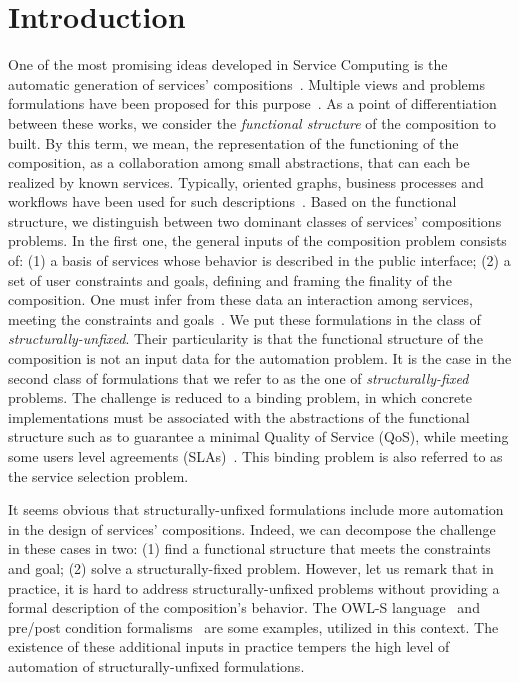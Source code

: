 \documentclass[a4paper]{article}
\begin{document}
\section{Introduction}


One of the most promising ideas developed in Service Computing is the automatic generation  
of services' compositions~\cite{Papazoglou03service-orientedcomputing,SOCValery,Bartalos}. 
Multiple views and problems formulations have been proposed for this purpose~\cite{Rao04asurvey}. 
As a point of differentiation between these works, we consider the {\it functional structure} 
of the composition to built. By this term, we mean, the representation of the functioning of the composition, as a 
collaboration among small abstractions, that can each be realized by known services. Typically, oriented graphs, 
 business processes and workflows have been used for such descriptions~\cite{Cardoso2004281,Weske2007,GoldmanNgoko}. 
Based on the functional structure, we distinguish between two dominant classes of services' compositions problems. 
In the first one, the general inputs of the composition problem consists of: (1) a basis of services whose behavior is described in the public interface; (2) a set of user constraints and goals, defining and framing the finality of the composition. 
One must infer from these data an interaction among services, meeting the constraints 
and goals~\cite{Bartalos,Sirin:2004:HPW:1741306.1741331,Jiang}. We put these formulations in the class of {\it structurally-unfixed}. 
Their particularity is that  the functional structure of the composition is not an input data for the automation problem. 
It is the case in the second class of formulations that we refer to as the one of {\it structurally-fixed} problems. 
The  challenge is reduced to a binding problem, in which concrete implementations must be associated with the 
abstractions of the functional structure such as to guarantee a minimal Quality of Service (QoS), while 
meeting some users level agreements (SLAs)~\cite{Alrifai,BenMokhtar,Yu,ZengMiddleware,Zheng,Ardagna,JISA,cpe3015}. 
This binding problem is also referred to as the service selection problem.

It seems obvious that structurally-unfixed formulations include more 
automation in the design of services' compositions. Indeed, we can decompose the challenge in these cases 
in two: (1) find a functional structure that meets the constraints and goal; (2) solve a structurally-fixed problem. 
However, let us remark that in practice, it is hard to address structurally-unfixed problems 
without providing a formal description of the composition's behavior. The OWL-S language~\cite{Sirin:2004:HPW:1741306.1741331} and pre/post condition formalisms~\cite{Bartalos,Oh05acomparative} are some examples, utilized in this context.
The existence of these additional inputs in practice tempers the high level of automation of structurally-unfixed 
formulations. 
\end{document}
